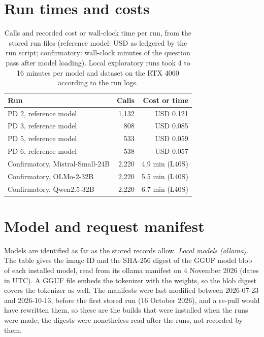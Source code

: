 \documentclass[11pt]{article}
\begin{document}
\section{Run times and costs}
\begin{table}[!ht]
\centering
\footnotesize
\caption{Calls and recorded cost or wall-clock time per run, from the stored run files (reference model: USD as ledgered by the run script; confirmatory: wall-clock minutes of the question pass after model loading). Local exploratory runs took 4 to 16 minutes per model and dataset on the RTX 4060 according to the run logs.}\label{tab:s-runtime}
\begin{tabular}{lrr}
\toprule
Run & Calls & Cost or time \\
\midrule
PD 2, reference model & 1,132 & USD 0.121 \\
PD 3, reference model & 808 & USD 0.085 \\
PD 5, reference model & 533 & USD 0.059 \\
PD 6, reference model & 538 & USD 0.057 \\
Confirmatory, Mistral-Small-24B & 2,220 & 4.9 min (L40S) \\
Confirmatory, OLMo-2-32B & 2,220 & 5.5 min (L40S) \\
Confirmatory, Qwen2.5-32B & 2,220 & 6.7 min (L40S) \\
\bottomrule
\end{tabular}
\end{table}

\section{Model and request manifest}
Models are identified as far as the stored records allow. \emph{Local models (ollama).} The table gives the image ID and the SHA-256 digest of the GGUF model blob of each installed model, read from its ollama manifest on 4 November 2026 (dates in UTC). A GGUF file embeds the tokenizer with the weights, so the blob digest covers the tokenizer as well. The manifests were last modified between 2026-07-23 and 2026-10-13, before the first stored run (16 October 2026), and a re-pull would have rewritten them, so these are the builds that were installed when the runs were made; the digests were nonetheless read after the runs, not recorded by them.
\end{document}
